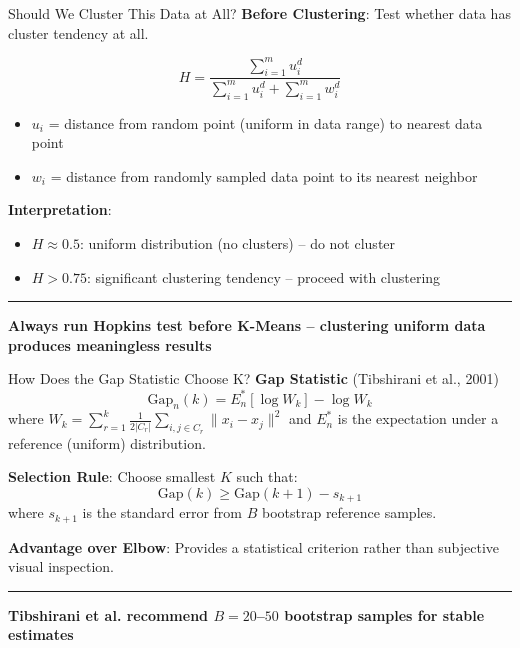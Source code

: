 \documentclass[8pt,aspectratio=169]{beamer}
\newcommand{\bottomnote}[1]{%
\vfill
\vspace{-2mm}
\textcolor{mllavender2}{\rule{\textwidth}{0.4pt}}
\vspace{1mm}
\footnotesize
\textbf{#1}
}
\begin{document}
\begin{frame}[t]{Should We Cluster This Data at All?}
\textbf{Before Clustering}: Test whether data has cluster tendency at all.
\vspace{0.3em}

$$H = \frac{\sum_{i=1}^m u_i^d}{\sum_{i=1}^m u_i^d + \sum_{i=1}^m w_i^d}$$
\begin{itemize}
\item $u_i$ = distance from random point (uniform in data range) to nearest data point
\item $w_i$ = distance from randomly sampled data point to its nearest neighbor
\end{itemize}
\vspace{0.3em}
\textbf{Interpretation}:
\begin{itemize}
\item $H \approx 0.5$: uniform distribution (no clusters) -- do not cluster
\item $H > 0.75$: significant clustering tendency -- proceed with clustering
\end{itemize}
\bottomnote{Always run Hopkins test before K-Means -- clustering uniform data produces meaningless results}
\end{frame}

\begin{frame}[t]{How Does the Gap Statistic Choose K?}
\textbf{Gap Statistic} (Tibshirani et al., 2001)
$$\text{Gap}_n(k) = E_n^*[\log W_k] - \log W_k$$
where $W_k = \sum_{r=1}^k \frac{1}{2|C_r|}\sum_{i,j \in C_r} \|x_i - x_j\|^2$ and $E_n^*$ is the expectation under a reference (uniform) distribution.
\vspace{0.3em}

\textbf{Selection Rule}: Choose smallest $K$ such that:
$$\text{Gap}(k) \geq \text{Gap}(k+1) - s_{k+1}$$
where $s_{k+1}$ is the standard error from $B$ bootstrap reference samples.
\vspace{0.3em}

\textbf{Advantage over Elbow}: Provides a statistical criterion rather than subjective visual inspection.
\bottomnote{Tibshirani et al. recommend $B = 20$--$50$ bootstrap samples for stable estimates}
\end{frame}
\end{document}
